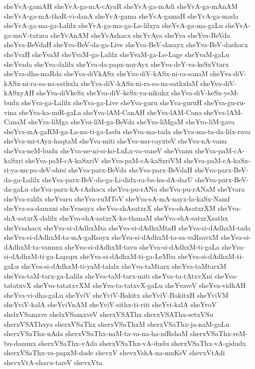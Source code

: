 {sheYvA-gamAH
sheYvA-ga-mA-cAyaR
sheYvA-ga-mAdi
sheYvA-ga-mAnAM
sheYvA-ga-mA-thaR-vi-danA
sheYvA-gama
sheYvA-gamaH
sheYvA-ga-mada
sheYvA-ga-ma-ga-Lalilx
sheYvA-ga-ma-ga-La-lilxya
sheYvA-ga-ma-gaLu
sheYvA-ga-moV-tatxra
sheYvAnAM
sheYvAshacx
sheYvAya
sheYva
sheYva-BeVda
sheYva-BeVdaH
sheYva-BeV-da-ga-Live
sheYva-BeV-dasayx
sheYva-BeV-dashacx
sheYvaH
sheYvaM
sheYvaM-ga-Lalilx
sheYvaM-ga-Lo-Lage
sheYvaM-gaLu
sheYvada
sheYva-dalilx
sheYva-da-papx-nayAyx
sheYva-deY-va-keSxVtarx
sheYva-dha-maRda
sheYva-diVkASx
sheYva-diV-kASx-ni-ra-sanaM
sheYva-diV-kASx-ni-ra-sa-na-sathxla
sheYva-diV-kASx-ni-ra-sa-na-sathxlaM
sheYva-diV-kASxyAH
sheYva-diVkeSx
sheYva-diV-keSx-ya-nikukx
sheYva-diV-keSx-yeM-budu
sheYva-ga-Lalilx
sheYva-ga-Live
sheYva-guru
sheYva-guruH
sheYva-gu-ru-vina
sheYva-ka-miR-gaLa
sheYva-lAM-CanAH
sheYva-lAM-Cana
sheYva-lAM-CanaM
sheYva-liMga
sheYva-liM-ga-BeVda
sheYva-liMgaM
sheYva-liM-gava
sheYva-mA-gaRM-ga-La-na-ti-ga-Ledu
sheYva-ma-tada
sheYva-ma-ta-da-lilx-ruva
sheYva-mi-tAyx-haqtaM
sheYva-miti
sheYva-mu-cayxteV
sheYva-nA-vanu
sheYva-neM-budu
sheYva-ne-ni-si-ko-LuLx-va-vaneV
sheYvanu
sheYva-paM-cA-kaSxri
sheYva-paM-cA-kaSxriV
sheYva-paM-cA-kaSxriVM
sheYva-paM-cA-kaSx-ri-ya-nu-pa-deV-shisi
sheYva-parx-BeVda
sheYva-parx-BeVdaH
sheYva-parx-BeV-da-ga-Lalilx
sheYva-parx-BeV-da-ga-Li-didx-ra-ba-hu-dA-darU
sheYva-parx-BeV-da-gaLu
sheYva-parx-kA-rAshacx
sheYva-pu-rANa
sheYva-pu-rANaM
sheYvara
sheYva-ralilx
sheYvaru
sheYva-ruMToV
sheYva-sA-mA-nayx-la-kaSx-Namf
sheYva-sa-damxni
sheYvasayx
sheYva-shAsatxrX
sheYva-shAsatxrXM
sheYva-shA-satxrX-dalilx
sheYva-shA-satxrX-ka-thanaM
sheYva-shA-satxrXsathx
sheYvashacx
sheYva-si-dAdhxMta
sheYva-si-dAdhxMtaH
sheYva-si-dAdhxM-tada
sheYva-si-dAdhxM-ta-mA-gaRsayx
sheYva-si-dAdhxM-ta-sa-vaRsavxM
sheYva-si-dAdhxM-ta-vanunx
sheYva-si-dAdhxM-tavu
sheYva-si-dAdhxM-ti-gaLa
sheYva-si-dAdhxM-ti-ga-Lapapx
sheYva-si-dAdhxM-ti-ga-LeMba
sheYva-si-dAdhxM-ti-gaLu
sheYva-si-dAdhxM-ti-yaM-talalx
sheYva-taMtarx
sheYva-taMtarxM
sheYva-taM-tarx-ga-Lalilx
sheYva-taM-tarx-miti
sheYva-ta-tAtxvXni
sheYva-tatatxvX
sheYva-tatatxvXM
sheYva-ta-tatxvX-gaLu
sheYvaveV
sheYva-vidhAH
sheYva-vi-dha-gaLu
sheYviV
sheYviV-Bakitx
sheYviV-BakitxH
sheYviVM
sheYviV-kalA
sheYviVnAM
sheYviV-sithx-ti-riti
sheYvi-kalA
sheYvoV
shelxVSamxve
shelxVSamxveV
sherxVSAThx
sherxVSAThx-setxVSu
sherxVSAThxya
sherxVSaThx
sherxVSaThxM
sherxVSaThx-ja-naM-gaLu
sherxVSaThx-nAda
sherxVSaThx-naM-ta-va-na-ha-niRshaM
sherxVSaThx-reM-bu-danunx
sherxVSaThx-vAda
sherxVSaThx-vA-dudu
sherxVSaThx-vA-gidudx
sherxVSaThx-va-papxM-dade
shevxV
shevxVshA-na-muKeV
shevxVtAdi
shevxVtA-shavx-tareV
shevxVta
}
